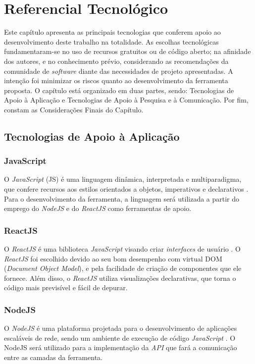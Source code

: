 \chapter[Referencial Tecnológico]{Referencial Tecnológico}

\label{chap:referencial_tecnologico}

Este capítulo apresenta as principais tecnologias que conferem apoio ao desenvolvimento deste trabalho na totalidade. As escolhas tecnológicas fundamentaram-se no uso de recursos gratuitos ou de código aberto; na afinidade dos autores, e no conhecimento prévio, considerando as recomendações da comunidade de \textit{software} diante das necessidades de projeto apresentadas. A intenção foi minimizar os riscos quanto ao desenvolvimento da ferramenta proposta. O capítulo está organizado em duas partes, sendo: Tecnologias de Apoio à Aplicação e Tecnologias de Apoio à Pesquisa e à Comunicação. Por fim, constam as Considerações Finais do Capítulo.

\section{Tecnologias de Apoio à Aplicação}

\label{tec_apoio_app}

\subsection{JavaScript}
O \textit{JavaScript} (JS) é uma linguagem dinâmica, interpretada e multiparadigma, que confere recursos aos estilos orientados a objetos, imperativos e declarativos \cite{javascript}. Para o desenvolvimento da ferramenta, a linguagem será utilizada a partir do emprego do \textit{NodeJS} e do \textit{ReactJS} como ferramentas de apoio.

\subsection{ReactJS}
O \textit{ReactJS} é uma biblioteca \textit{JavaScript} visando criar \textit{interfaces} de usuário \cite{reactjs}. O \textit{ReactJS} foi escolhido devido ao seu bom desempenho com virtual DOM (\textit{Document Object Model}), e pela facilidade de criação de componentes que ele fornece. Além disso, o \textit{ReactJS} utiliza visualizações declarativas, que torna o código mais previsível e fácil de depurar.

\subsection{NodeJS}
O \textit{NodeJS} é uma plataforma projetada para o desenvolvimento de aplicações escaláveis de rede, sendo um ambiente de execução de código \textit{JavaScript} \cite{nodejs}. O NodeJS será utilizado para a implementação da \textit{API} que fará a comunicação entre as camadas da ferramenta.

